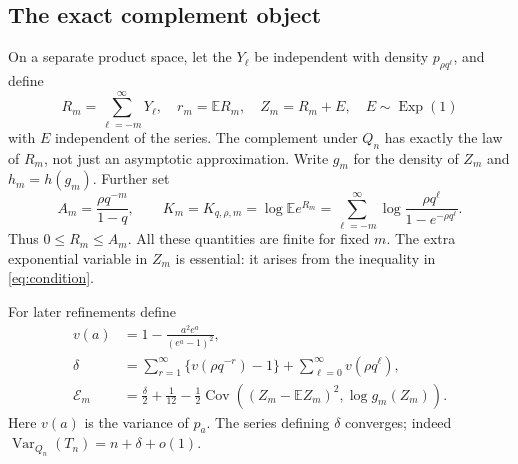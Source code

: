 \documentclass[11pt,a4paper]{article}
\numberwithin{equation}{section}
\theoremstyle{definition}
\theoremstyle{remark}
\newcommand{\E}{\mathbb E}
\newcommand{\Var}{\operatorname{Var}}
\newcommand{\Cov}{\operatorname{Cov}}
\newcommand{\Exp}{\operatorname{Exp}}
\begin{document}
\subsection{The exact complement object}
On a separate product space, let the $Y_\ell$ be independent with density
$p_{\rho q^\ell}$, and define
\begin{equation}\label{eq:Rm}
R_m=\sum_{\ell=-m}^{\infty}Y_\ell,\quad
r_m=\E R_m,\quad Z_m=R_m+E,\quad E\sim\Exp(1)
\end{equation}
with $E$ independent of the series. The complement under $Q_n$ has exactly
the law of $R_m$, not just an asymptotic approximation. Write $g_m$ for
the density of $Z_m$ and $h_m=h(g_m)$. Further set
\begin{equation}\label{eq:AK}
A_m=\frac{\rho q^{-m}}{1-q},\qquad
K_m=K_{q,\rho,m}=\log\E e^{R_m}
 =\sum_{\ell=-m}^{\infty}
   \log\frac{\rho q^\ell}{1-e^{-\rho q^\ell}}.
\end{equation}
Thus $0\le R_m\le A_m$. All these quantities are finite for fixed $m$.
The extra exponential variable in $Z_m$ is essential: it arises from the
inequality in \eqref{eq:condition}.

For later refinements define
\begin{align}
v(a)&=1-\frac{a^2e^a}{(e^a-1)^2},\label{eq:varone}\\
\delta&=\sum_{r=1}^{\infty}\{v(\rho q^{-r})-1\}
          +\sum_{\ell=0}^{\infty}v(\rho q^\ell),\label{eq:delta}\\
\mathscr E_m&=\frac{\delta}{2}+\frac1{12}
 -\frac12\Cov\!\left((Z_m-\E Z_m)^2,\log g_m(Z_m)\right).
\label{eq:Ecoeff}
\end{align}
Here $v(a)$ is the variance of $p_a$. The series defining $\delta$ converges;
indeed $\Var_{Q_n}(T_n)=n+\delta+o(1)$.
\end{document}
